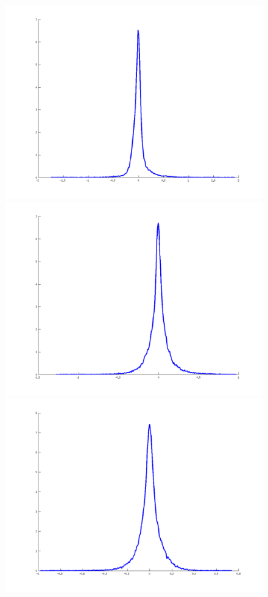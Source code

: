 \documentclass[runningheads]{llncs}
\begin{document}
\begin{figure}[!h]
    \begin{minipage}{0.3\linewidth}
    \includegraphics[width=\linewidth]{h_3}
    \end{minipage}
    \begin{minipage}{0.3\linewidth}
    \includegraphics[width=\linewidth]{h_4}
    \end{minipage}
    \begin{minipage}{0.3\linewidth}
    \includegraphics[width=\linewidth]{h_5}

\end{minipage}
\end{figure}
\end{document}

